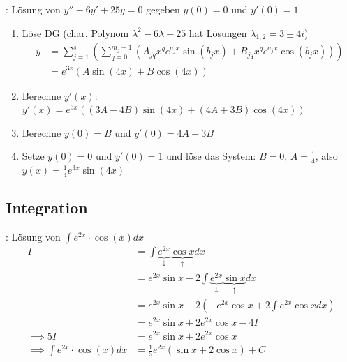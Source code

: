 \Bsp {}: Lösung von $y'' - 6y' + 25y = 0$ gegeben $y(0) = 0$ und $y'(0) = 1$
\begin{enumerate}
    \item Löse DG (char. Polynom $\lambda^2 - 6\lambda + 25$ hat Lösungen $\lambda_{1, 2} = 3 \pm 4i$)
    \begin{align*}
        y &= \sum_{j=1}^{s} \left(\sum_{q=0}^{m_j-1}(A_{jq} x^q e^{a_j x} \sin(b_j x) + B_{jq} x^q e^{a_j x} \cos(b_j x))\right) \\
          &= e^{3x} (A \sin(4 x) + B  \cos(4 x))
    \end{align*}
    \item Berechne $y'(x)$: $y'(x) = e^{3x} ((3A - 4B) \sin(4x) + (4A + 3B) \cos(4x))$
    \item Berechne $y(0) = B$ und $y'(0) = 4A + 3B$
    \item Setze $y(0) = 0$ und $y'(0) = 1$ und löse das System: $B = 0$, $A = \frac{1}{4}$,
     also  $y(x) = \frac{1}{4}e^{3x} \sin(4 x)$
\end{enumerate}

\subsection{Integration}

\Bsp {}: Lösung von $\displaystyle \int e^{2x} \cdot \cos(x) dx$
\vspace{-0.6em}
\begin{align*}
     I &= \int \underbrace{e^{2x}}_\downarrow \underbrace{\cos x}_\uparrow dx \\[-0.8em]
       &= e^{2x} \sin x - 2 \int \underbrace{e^{2x}}_\downarrow \underbrace{\sin x}_\uparrow dx \\[-0.8em]
       &= e^{2x} \sin x - 2 (-e^{2x} \cos x + 2 \int e^{2x} \cos x dx) \\[-0.6em]
       &= e^{2x} \sin x + 2 e^{2x} \cos x - 4 I \\[-0.2em]
    \implies 5I &= e^{2x} \sin x + 2 e^{2x} \cos x \\[-0.4em]
    \implies \int e^{2x} \cdot \cos(x) dx &= \frac{1}{5}e^{2x}(\sin x + 2\cos x) + C
\end{align*}


